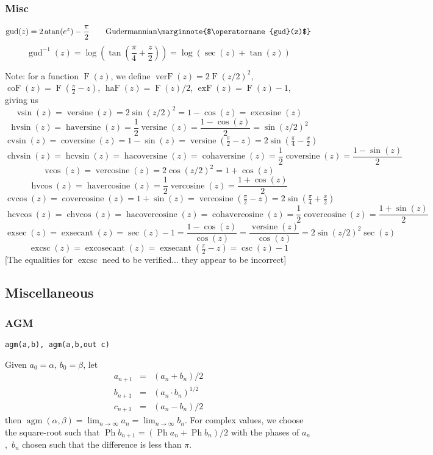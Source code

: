 \documentclass[10pt,dvipdfmx,letterpaper,twoside]{article}
\DeclareMathOperator{\atan}{atan}
\let\O=\operatorname
\let\DEF=\marginnote
\let\al=\alpha
\begin{document}
\subsubsection{Misc}
\[ \O{gud}(z) = 2\atan(e^{z}) - \frac\pi2 \qquad\text{Gudermannian} \DEF{$\O{gud}(z)$}\]
\[ \O{gud}^{-1}(z) = \log(\tan(\frac{\pi}{4}+\frac{z}{2})) = \log(\sec(z) + \tan(z)) \]

Note: for a function $\O{F}(z)$, we define
$\O{verF}(z) = 2 \O{F}(z/2)^2$, 
$\O{coF}(z) = \O{F}(\tfrac{\pi}{2} - z)$, 
$\O{haF}(z) = \O{F}(z)/2$, 
$\O{exF}(z) = \O{F}(z) - 1$, giving us
\[ \O{vsin}(z) = \O{versine}(z) =  2\sin(z/2)^2 = 1 - \cos(z) = \O{excosine}(z) \]
\[ \O{hvsin}(z) = \O{haversine}(z) = \frac12\O{versine}(z) = \frac{1-\cos(z)}{2} = \sin(z/2)^2 \]
\[ \O{cvsin}(z) = \O{coversine}(z) = 1 - \sin(z) = \O{versine}(\tfrac\pi2 - z) = 2\sin(\tfrac\pi4 - \tfrac{x}{2}) \]
\[ \O{chvsin}(z) = \O{hcvsin}(z) = \O{hacoversine}(z) = \O{cohaversine}(z) = \frac12\O{coversine}(z) = \frac{1-\sin(z)}{2} \]
\[ \O{vcos}(z) = \O{vercosine}(z) =  2\cos(z/2)^2 = 1 + \cos(z) \]
\[ \O{hvcos}(z) = \O{havercosine}(z) = \frac12\O{vercosine}(z) = \frac{1+\cos(z)}{2} \]
\[ \O{cvcos}(z) = \O{covercosine}(z) = 1 + \sin(z) = \O{vercosine}(\tfrac\pi2 - z) = 2\sin(\tfrac\pi4 + \tfrac{x}{2}) \]
\[ \O{hcvcos}(z) = \O{chvcos}(z) = \O{hacovercosine}(z) = \O{cohavercosine}(z) = \frac12\O{covercosine}(z) = \frac{1+\sin(z)}{2} \]
\[ \O{exsec}(z) = \O{exsecant}(z) = \sec(z) - 1 = \frac{1-\cos(z)}{\cos(z)} = \frac{\O{versine}(z)}{\cos(z)} = 2\sin(z/2)^2\sec(z) \]
\[ \O{excsc}(z) = \O{excosecant}(z) = \O{exsecant}(\tfrac\pi2 - z) = \csc(z) - 1\]
[The equalities for $\O{excsc}$ need to be verified... they appear to be incorrect]

\subsection{Miscellaneous}

\subsubsection{AGM}

{\tt agm(a,b), agm(a,b,out c)}

Given $a_0=\al$, $b_0=\beta$, let 
\begin{eqnarray*}
  a_{n+1} &=& (a_n + b_n)/2 \\
  b_{n+1} &=& (a_n \cdot b_n)^{1/2} \\
  c_{n+1} &=& (a_n - b_n)/2
\end{eqnarray*}
then $\O{agm}(\al,\beta) = \lim_{n\to\infty}a_n = \lim_{n\to\infty}b_n$.
For complex values, we choose the square-root such that $\O{Ph}b_{n+1} = (\O{Ph}a_n + \O{Ph}b_n)/2$ with
the phases of $a_n$,~$b_n$ chosen such that the difference is less than $\pi$.
\end{document}
